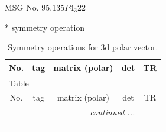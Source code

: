 \documentclass[fleqn,8pt]{jsarticle}
\begin{document}
\setcounter{MaxMatrixCols}{32}

\renewcommand{\tablename}{Table~}
\renewcommand{\figurename}{Figure~}
\begin{center}
\LARGE
MSG No. 95.135\quad$P4_{3}22$
\end{center}
* symmetry operation
\renewcommand{\arraystretch}{1.3}
\begin{longtable}{ccccc}
\caption{Symmetry operations for 3d polar vector.}
 \\
 \hline \hline
No. & tag & matrix (polar) & det & TR \\ \hline \endfirsthead

\multicolumn{4}{l}{\tablename\ \thetable{}} \\
 \hline \hline
No. & tag & matrix (polar) & det & TR \\ \hline \endhead

 \hline \hline
\multicolumn{4}{r}{\footnotesize\it continued ...} \\ \endfoot

 \hline \hline
\multicolumn{4}{r}{} \\ \endlastfoot


\end{longtable}
\end{document}
